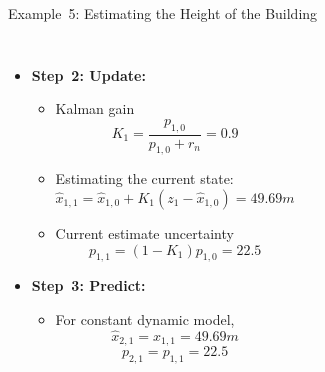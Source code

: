 \begin{frame}{Example~5: Estimating the Height of the Building}
\begin{columns}
\begin{itemize}
\begin{itemize}
                \item The first measurement is
                $$z_1 = 48.54m$$
                \item The measurement uncertainty (since $\sigma=5$)
                $$r_1 = 25$$
            \end{itemize}
        \item \textbf{Step~2: Update:}
            \begin{itemize}
                \item Kalman gain
                $$K_1 = \frac{p_{1,0}}{p_{1,0} + r_n} = 0.9$$
                \item Estimating the current state:
                $$\hat{x}_{1,1} = \hat{x}_{1,0} + K_1 (z_1 - \hat{x}_{1,0}) = 49.69m$$
                \item  Current estimate uncertainty
                $$p_{1,1} = (1-K_1) p_{1,0} = 22.5$$
            \end{itemize}
        \item \textbf{Step~3: Predict:}
            \begin{itemize}
                \item For constant dynamic model,  
                $$\hat{x}_{2,1} = \hat{x}_{1,1} = 49.69m$$
                $$p_{2,1} = p_{1,1} = 22.5$$
                
            \end{itemize}
    \end{itemize}
\end{columns}
    
    
\end{frame}


